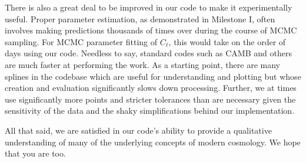 \documentclass[aps,prl,twocolumn,groupedaddress,nofootinbib]{revtex4-2}
\begin{document}
There is also a great deal to be improved in our code to make it experimentally useful. Proper parameter estimation, as demonstrated in Milestone I, often involves making predictions thousands of times over during the course of MCMC sampling. For MCMC parameter fitting of $C_\ell$, this would take on the order of days using our code. Needless to say, standard codes such as CAMB \cite{camb} and others are much faster at performing the work. As a starting point, there are many splines in the codebase which are useful for understanding and plotting but whose creation and evaluation significantly slows down processing. Further, we at times use significantly more points and stricter tolerances than are necessary given the sensitivity of the data and the shaky simplifications behind our implementation.

All that said, we are satisfied in our code's ability to provide a qualitative understanding of many of the underlying concepts of modern cosmology. We hope that you are too.



\clearpage
\appendix
\end{document}
